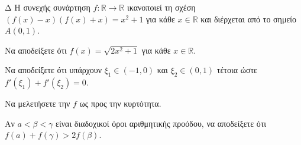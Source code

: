 \begin{thema}{Δ}
H συνεχής συνάρτηση $f:\mathbb{R}\to\mathbb{R}$ ικανοποιεί τη σχέση $(f(x) - x)(f(x) + x) = x^2 + 1$ για κάθε $x \in \mathbb{R}$ και διέρχεται από το σημείο $A(0, 1)$.
\begin{erwthma}
    \item Να αποδείξετε ότι $f(x) = \sqrt{2x^2 + 1}$ για κάθε $x \in \mathbb{R}$.
    \item Να αποδείξετε ότι υπάρχουν $\xi_1 \in (-1, 0)$ και $\xi_2 \in (0, 1)$ τέτοια ώστε $f'(\xi_1) + f'(\xi_2) = 0$.
    \item Να μελετήσετε την $f$ ως προς την κυρτότητα.
    \item Αν $a < \beta < \gamma$ είναι διαδοχικοί όροι αριθμητικής προόδου, να αποδείξετε ότι $f(a) + f(\gamma) > 2f(\beta)$.
\end{erwthma}
\end{thema}
